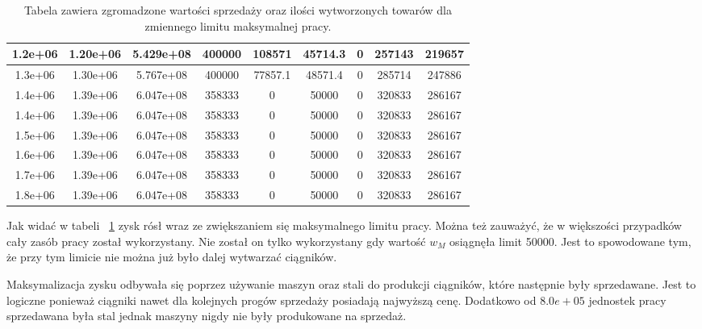 \documentclass{article}
\begin{document}
\begin{table}[H]
\begin{center}
\begin{tabular}{|c| c| c| c| c| c| c| c| c| }
      1.2e+06  &1.20e+06  &5.429e+08  &400000   &108571   &45714.3  &0  &257143   &219657 \\ \hline
      1.3e+06  &1.30e+06  &5.767e+08  &400000   &77857.1  &48571.4  &0  &285714   &247886 \\ \hline
      1.4e+06  &1.39e+06  &6.047e+08  &358333   &0        &50000    &0  &320833   &286167 \\ \hline
      1.4e+06  &1.39e+06  &6.047e+08  &358333   &0        &50000    &0  &320833   &286167 \\ \hline
      1.5e+06  &1.39e+06  &6.047e+08  &358333   &0        &50000    &0  &320833   &286167 \\ \hline
      1.6e+06  &1.39e+06  &6.047e+08  &358333   &0        &50000    &0  &320833   &286167 \\ \hline
      1.7e+06  &1.39e+06  &6.047e+08  &358333   &0        &50000    &0  &320833   &286167 \\ \hline
      1.8e+06  &1.39e+06  &6.047e+08  &358333   &0        &50000    &0  &320833   &286167 \\ \hline
    \end{tabular} 
    \caption{\label{table:allData}Tabela zawiera zgromadzone wartości sprzedaży oraz ilości wytworzonych towarów dla zmiennego limitu maksymalnej pracy.}
  \end{center}
\end{table}

Jak widać w tabeli ~\ref{table:allData} zysk rósł wraz ze zwiększaniem się maksymalnego limitu pracy. Można też zauważyć, że w większości przypadków cały zasób pracy został wykorzystany. Nie został on
tylko wykorzystany gdy wartość $w_M$ osiągnęła limit 50000. Jest to spowodowane tym, że przy tym limicie nie można już było dalej wytwarzać ciągników.

Maksymalizacja zysku odbywała się poprzez używanie maszyn oraz stali do produkcji ciągników, które następnie były sprzedawane. Jest to logiczne ponieważ ciągniki nawet dla kolejnych progów sprzedaży posiadają
najwyższą cenę. Dodatkowo od $8.0e+05$ jednostek pracy sprzedawana była stal jednak maszyny nigdy nie były produkowane na sprzedaż.
\end{document}

